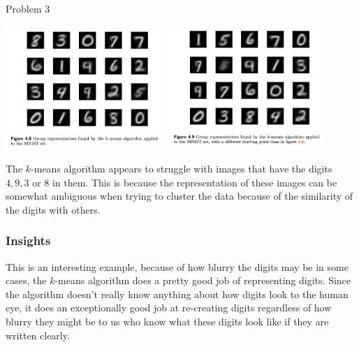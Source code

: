 \begin{problem}{Problem 3}
\begin{highlight}[Solution]
        \begin{center}
            \includegraphics[width = 0.45\textwidth]{./Images/Figure 4.8.png}
            \hspace*{20pt}
            \includegraphics[width = 0.45\textwidth]{./Images/Figure 4.9.png}
        \end{center}
        The $k$-means algorithm appears to struggle with images that have the digits $4,9,3$ or $8$ in them. This is because the representation of these images can be somewhat ambiguous when trying to cluster
        the data because of the similarity of the digits with others. \vspace*{1em}

        \subsubsection*{Insights}

        This is an interesting example, because of how blurry the digits may be in some cases, the $k$-means algorithm does a pretty good job of representing digits. Since the algorithm doesn't really know
        anything about how digits look to the human eye, it does an exceptionally good job at re-creating digits regardless of how blurry they might be to us who know what these digits look like if they are
        written clearly.
    \end{highlight}
\end{problem}

